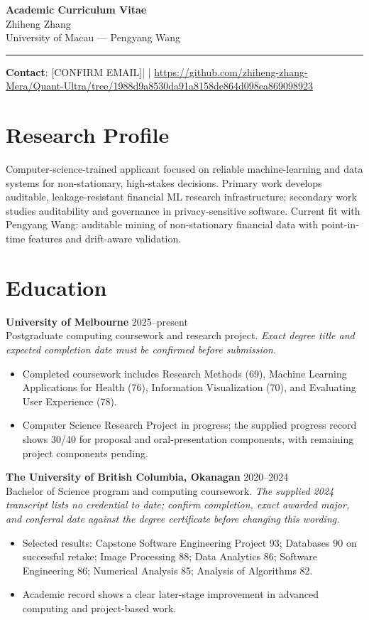\documentclass[11pt]{article}
\newcommand{\ApplicantName}{Zhiheng Zhang}
\newcommand{\ApplicantEmail}{[CONFIRM EMAIL]}
\newcommand{\ApplicantPhone}{[CONFIRM PHONE]}
\newcommand{\ApplicantGitHub}{\url{https://github.com/zhiheng-zhang-Mera/Quant-Ultra/tree/1988d9a8530da91a8158de864d098ea869098923}}
\begin{document}
\begin{center}
{\LARGE\bfseries Academic Curriculum Vitae}\\[0.25em]
{\large \ApplicantName}\\
University of Macau --- Pengyang Wang
\end{center}
\vspace{0.35em}\hrule\vspace{0.65em}

\textbf{Contact}: \ApplicantEmail\quad | \quad \ApplicantPhone\quad | \quad \ApplicantGitHub

\section*{Research Profile}
Computer-science-trained applicant focused on reliable machine-learning and data systems for non-stationary, high-stakes decisions. Primary work develops auditable, leakage-resistant financial ML research infrastructure; secondary work studies auditability and governance in privacy-sensitive software. Current fit with Pengyang Wang: auditable mining of non-stationary financial data with point-in-time features and drift-aware validation.

\section*{Education}
\textbf{University of Melbourne} \hfill 2025--present\\
Postgraduate computing coursework and research project. \textit{Exact degree title and expected completion date must be confirmed before submission.}
\begin{itemize}
\item Completed coursework includes Research Methods (69), Machine Learning Applications for Health (76), Information Visualization (70), and Evaluating User Experience (78).
\item Computer Science Research Project in progress; the supplied progress record shows 30/40 for proposal and oral-presentation components, with remaining project components pending.
\end{itemize}

\textbf{The University of British Columbia, Okanagan} \hfill 2020--2024\\
Bachelor of Science program and computing coursework. \textit{The supplied 2024 transcript lists no credential to date; confirm completion, exact awarded major, and conferral date against the degree certificate before changing this wording.}
\begin{itemize}
\item Selected results: Capstone Software Engineering Project 93; Databases 90 on successful retake; Image Processing 88; Data Analytics 86; Software Engineering 86; Numerical Analysis 85; Analysis of Algorithms 82.
\item Academic record shows a clear later-stage improvement in advanced computing and project-based work.
\end{itemize}
\end{document}
